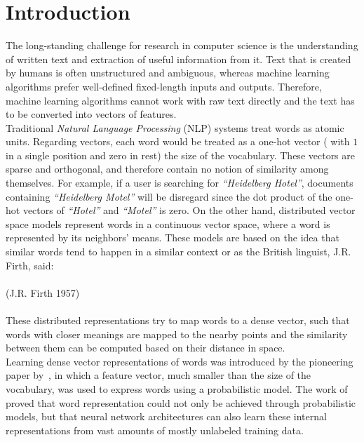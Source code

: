 \chapter{Introduction}\label{chap:intro}
The long-standing challenge for research in computer science is the understanding of written text and extraction of useful information from it. Text that is created by humans is often unstructured and ambiguous, whereas machine learning algorithms prefer well-defined fixed-length inputs and outputs. Therefore, machine learning algorithms cannot work with raw text directly and the text has to be converted into vectors of features.
\\
\noindent
Traditional \emph{Natural Language Processing} (NLP) systems treat words as atomic units. Regarding vectors, each word would be treated as a one-hot vector ( with $1$ in a single position and zero in rest) the size of the vocabulary. These vectors are sparse and orthogonal, and therefore contain no notion of similarity among themselves. For example, if a user is searching for \emph{``Heidelberg Hotel''}, documents containing \emph{``Heidelberg Motel''} will be disregard since the dot product of the one-hot vectors of \emph{``Hotel''} and \emph{``Motel''} is zero. On the other hand, distributed vector space models represent words in a continuous vector space, where a word is represented by its neighbors' means. These models are based on the idea that similar words tend to happen in a similar context or as the British linguist, J.R. Firth, said:
\\
\\
\noindent
{} (J.R. Firth 1957)\\
\\
\noindent
These distributed representations try to map words to a dense vector, such that words with closer meanings are mapped to the nearby points and the similarity between them can be computed based on their distance in space.
\\
\noindent 
Learning dense vector representations of words was introduced by the pioneering paper by~, in which a feature vector, much smaller than the size of the vocabulary, was used to express words using a probabilistic model. The work of~ proved that word representation could not only be achieved through probabilistic models, but that neural network architectures can also learn these internal representations from vast amounts of mostly unlabeled training data.\\

